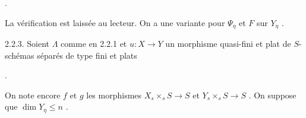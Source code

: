 \begin{center}
\quad .
\end{center}


La vérification est laissée au lecteur. On a une variante pour $\Psi_\eta$ et $F$ sur $Y_\eta$ .

2.2.3. Soient $\Lambda$ comme en 2.2.1 et $u : X \to Y$ un morphisme quasi-fini et plat de $S$-schémas séparés de type fini et plats

\begin{center}
\quad .
\end{center}
On note encore $f$ et $g$ les morphismes $X_s \times_s S \to S$ et $Y_s \times_s S \to S$ . On suppose que $\dim Y_\eta \leq n$ .

